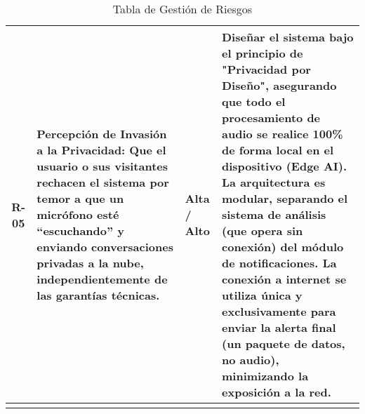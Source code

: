 {\begin{longtable}[c]{c p{5.8cm} >{\centering\arraybackslash}p{2cm} p{5.8cm}}
      \addlinespace
      R-05 & Percepción de Invasión a la Privacidad: Que el usuario o sus visitantes rechacen el sistema por temor a que un micrófono esté ``escuchando'' y enviando conversaciones privadas a la nube, independientemente de las garantías técnicas.                          & Alta / Alto            & Diseñar el sistema bajo el principio de "Privacidad por Diseño", asegurando que todo el procesamiento de audio se realice 100\% de forma local en el dispositivo (Edge AI). La arquitectura es modular, separando el sistema de análisis (que opera sin conexión) del módulo de notificaciones. La conexión a internet se utiliza única y exclusivamente para enviar la alerta final (un paquete de datos, no audio), minimizando la exposición a la red. \\
      \bottomrule
      \addlinespace

      \caption{Tabla de Gestión de Riesgos}
      \label{tab:risk-management}
    \end{longtable}
  }